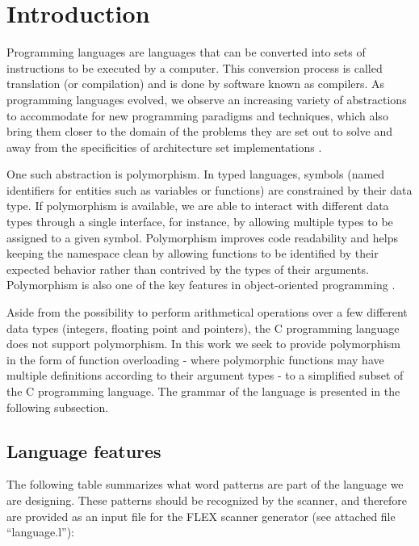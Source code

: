 
\section{Introduction}
Programming languages are languages that can be converted into sets of instructions to be
executed by a computer. This conversion process is called translation (or compilation) and
is done by software known as compilers. As programming languages evolved, we observe an
increasing variety of abstractions to accommodate for new programming paradigms and
techniques, which also bring them closer to the domain of the problems they are set
out to solve and away from the specificities of architecture set implementations \cite{Aho2007}.

One such abstraction is polymorphism. In typed languages, symbols (named identifiers
for entities such as variables or functions) are constrained by their data type.
If polymorphism is available, we are able to interact with different data types
through a single interface, for instance, by allowing multiple types to be assigned
to a given symbol. Polymorphism improves code readability and helps keeping the namespace
clean by allowing functions to be identified by their expected behavior rather than
contrived by the types of their arguments. Polymorphism is also one of the key features
in object-oriented programming \cite{Aho2007, Strachey2000}.

Aside from the possibility to perform arithmetical operations over a few different
data types (integers, floating point and pointers), the C programming language does
not support polymorphism. In this work we seek to provide polymorphism in the form
of function overloading - where polymorphic functions may have multiple definitions
according to their argument types - to a simplified subset of the C programming language.
The grammar of the language is presented in the following subsection.


\subsection{Language features}
The following table summarizes what word patterns are part of the language we are designing.
These patterns should be recognized by the scanner, and therefore are provided as an input file
for the FLEX \cite{FLEX} scanner generator (see attached file ``language.l''):

